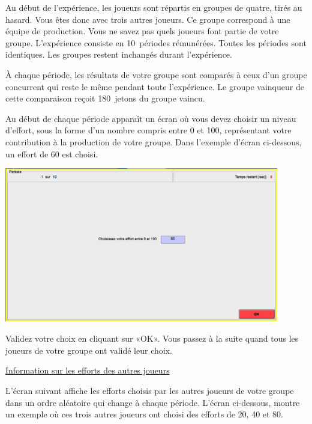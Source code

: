 \begin{Article}
\begin{refsection}[Lebourges]
\begin{appendices}
Au début de l'expérience, les joueurs sont répartis en groupes de
quatre, tirés au hasard. Vous êtes donc avec trois autres joueurs. Ce
groupe correspond à une équipe de production. Vous ne savez pas quels
joueurs font partie de votre groupe. L'expérience consiste en
10~périodes rémunérées. Toutes les périodes sont identiques. Les groupes
restent inchangés durant l'expérience.

À chaque période, les résultats de votre groupe sont comparés à ceux
d'un groupe concurrent qui reste le même pendant toute l'expérience. Le
groupe vainqueur de cette comparaison reçoit 180~jetons du groupe
vaincu.

Au début de chaque période apparaît un écran où vous devez choisir un
niveau d'effort, sous la forme d'un nombre compris entre 0 et 100,
représentant votre contribution à la production de votre groupe. Dans
l'exemple d'écran ci-dessous, un effort de 60 est choisi.

\vspace{0,2cm}

\includegraphics[width = 0.9\textwidth]{05_fig12-annexII.png}

Validez votre choix en cliquant sur «OK». Vous passez à la suite quand
tous les joueurs de votre groupe ont validé leur choix.

\vspace{.2cm}
\ul{Information sur les efforts des autres joueurs}

\vspace{.2cm}
L'écran suivant affiche les efforts choisis par les autres joueurs de
votre groupe dans un ordre aléatoire qui change à chaque période.
L'écran ci-dessous, montre un exemple où ces trois autres joueurs ont
choisi des efforts de 20, 40 et 80.

\vspace{0,2cm}


\end{appendices}
\end{refsection}
\end{Article}
